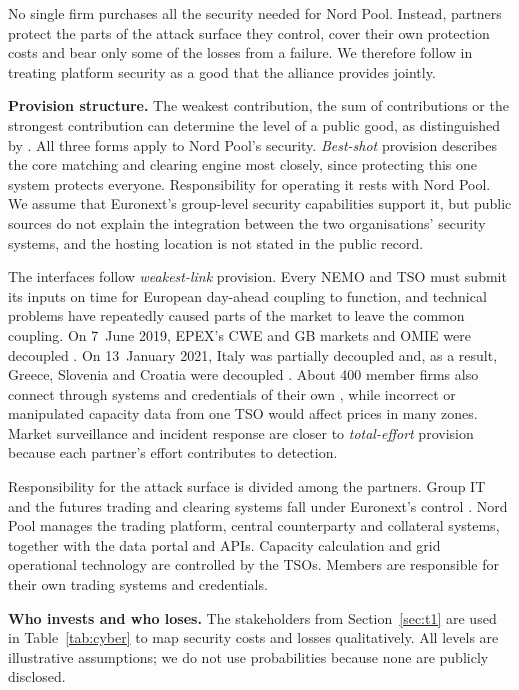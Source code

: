 No single firm purchases all the security needed for Nord Pool. Instead, partners protect the parts of the attack surface they control, cover their own protection costs and bear only some of the losses from a failure. We therefore follow \citet{Kianpour2022} in treating platform security as a good that the alliance provides jointly.

\textbf{Provision structure.} The weakest contribution, the sum of contributions or the strongest contribution can determine the level of a public good, as distinguished by \citet{Hirshleifer1983}. All three forms apply to Nord Pool's security. \emph{Best-shot} provision describes the core matching and clearing engine most closely, since protecting this one system protects everyone. Responsibility for operating it rests with Nord Pool. We assume that Euronext's group-level security capabilities support it, but public sources do not explain the integration between the two organisations' security systems, and the hosting location is not stated in the public record.

The interfaces follow \emph{weakest-link} provision. Every NEMO and TSO must submit its inputs on time for European day-ahead coupling to function, and technical problems have repeatedly caused parts of the market to leave the common coupling. On 7~June 2019, EPEX's CWE and GB markets and OMIE were decoupled \citep{NPIncident2019}. On 13~January 2021, Italy was partially decoupled and, as a result, Greece, Slovenia and Croatia were decoupled \citep{SDAC2021}. About 400 member firms also connect through systems and credentials of their own \citep{NP2024}, while incorrect or manipulated capacity data from one TSO would affect prices in many zones. Market surveillance and incident response are closer to \emph{total-effort} provision because each partner's effort contributes to detection.

Responsibility for the attack surface is divided among the partners. Group IT and the futures trading and clearing systems fall under Euronext's control \citep{Euronext2026}. Nord Pool manages the trading platform, central counterparty and collateral systems, together with the data portal and APIs. Capacity calculation and grid operational technology are controlled by the TSOs. Members are responsible for their own trading systems and credentials.

\textbf{Who invests and who loses.} The stakeholders from Section~\ref{sec:t1} are used in Table~\ref{tab:cyber} to map security costs and losses qualitatively. All levels are illustrative assumptions; we do not use probabilities because none are publicly disclosed.

